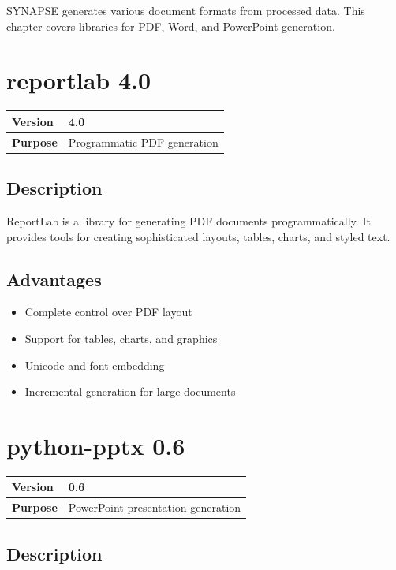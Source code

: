 \documentclass[12pt,a4paper]{report}
\begin{document}
SYNAPSE generates various document formats from processed data. This chapter covers libraries for PDF, Word, and PowerPoint generation.

\section{reportlab 4.0}

\begin{tabular}{|p{4cm}|p{10cm}|}
\hline
\textbf{Version} & 4.0 \\
\hline
\textbf{Purpose} & Programmatic PDF generation \\
\hline
\end{tabular}

\subsection{Description}

ReportLab is a library for generating PDF documents programmatically. It provides tools for creating sophisticated layouts, tables, charts, and styled text.

\subsection{Advantages}

\begin{itemize}
    \item Complete control over PDF layout
    \item Support for tables, charts, and graphics
    \item Unicode and font embedding
    \item Incremental generation for large documents
\end{itemize}

\section{python-pptx 0.6}

\begin{tabular}{|p{4cm}|p{10cm}|}
\hline
\textbf{Version} & 0.6 \\
\hline
\textbf{Purpose} & PowerPoint presentation generation \\
\hline
\end{tabular}

\subsection{Description}
\end{document}
